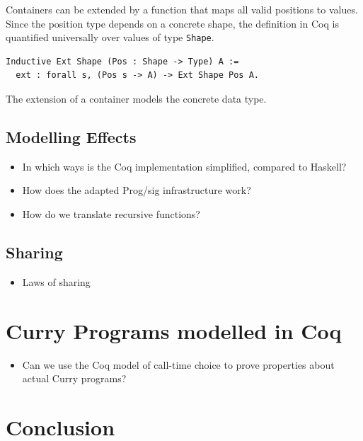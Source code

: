 \documentclass[a4paper, 11pt, fleqn, twoside]{scrreprt}
\begin{document}
Containers can be extended by a function that maps all valid positions to 
values. Since the position type depends on a concrete shape, the definition in 
Coq is quantified universally over values of type \texttt{Shape}.

\begin{verbatim}
Inductive Ext Shape (Pos : Shape -> Type) A := 
  ext : forall s, (Pos s -> A) -> Ext Shape Pos A.
\end{verbatim}

The extension of a container models the concrete data type.

\section{Modelling Effects}
\begin{itemize}
\item In which ways is the Coq implementation simplified, compared to Haskell?
\item How does the adapted Prog/sig infrastructure work?
\item How do we translate recursive functions?
\end{itemize}

\section{Sharing}
\label{LOS}
\begin{itemize}
\item Laws of sharing
\end{itemize}

\chapter{Curry Programs modelled in Coq}
\begin{itemize}
\item Can we use the Coq model of call-time choice to prove properties about 
actual Curry programs?
\end{itemize}

\chapter{Conclusion}



\appendix
\end{document}
